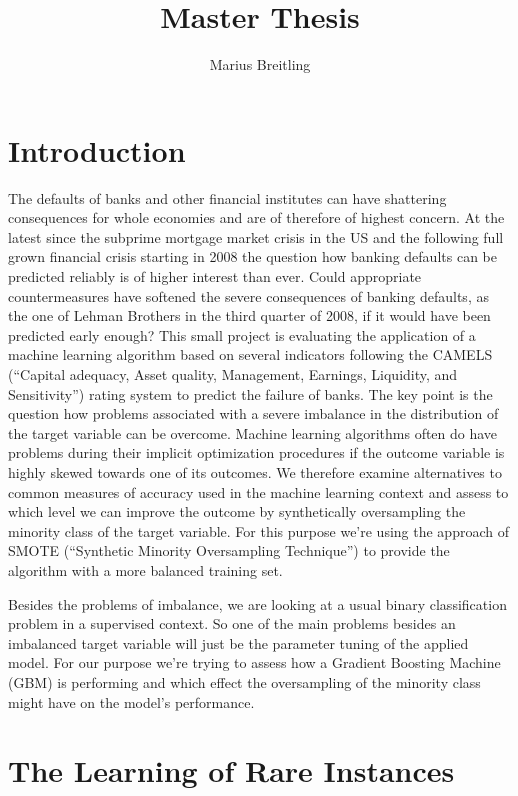 \documentclass[12pt,a4paper]{article}
\author{Marius Breitling}
\title{Master Thesis}
\begin{document}

\clearpage
{}
\setcounter{page}{2}
\tableofcontents
\printglossary[type=\acronymtype]
\pagebreak
{}
\section{Introduction}
The defaults of banks and other financial institutes can have shattering consequences for whole economies and are of therefore of highest concern. At the latest since the subprime mortgage market crisis in the US and the following full grown financial crisis starting in 2008 the question how banking defaults can be predicted reliably is of higher interest than ever. Could appropriate countermeasures have softened the severe consequences of banking defaults, as the one of Lehman Brothers in the third quarter of 2008, if it would have been predicted early enough? This small project is evaluating the application of a machine learning algorithm based on several indicators following the CAMELS (\enquote{Capital adequacy, Asset quality, Management, Earnings, Liquidity, and Sensitivity}) rating system to predict the failure of banks. The key point is the question how problems associated with a severe imbalance in the distribution of the target variable can be overcome. Machine learning algorithms often do have problems during their implicit optimization procedures if the outcome variable is highly skewed towards one of its outcomes. We therefore examine alternatives to common measures of accuracy used in the machine learning context and assess to which level we can improve the outcome by synthetically oversampling the minority class of the target variable. For this purpose we're using the approach of SMOTE (\enquote{Synthetic Minority Oversampling Technique}) to provide the algorithm with a more balanced training set.\par
Besides the problems of imbalance, we are looking at a usual binary classification problem in a supervised context. So one of the main problems besides an imbalanced target variable will just be the parameter tuning of the applied model. For our purpose we're trying to assess how a Gradient Boosting Machine (GBM) is performing and which effect the oversampling of the minority class might have on the model's performance.
\section{The Learning of Rare Instances}
\end{document}
